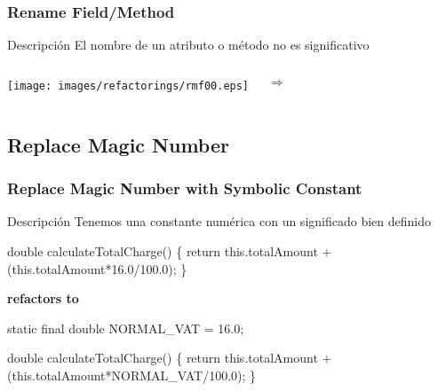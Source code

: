 ﻿\documentclass[animated,a4paper,slidestop,xcolor=pst,blue]{beamer}
\begin{document}
\begin{frame}
	\frametitle{Rename Field/Method}
	\begin{block}{Descripción}
	El nombre de un atributo o método no es significativo
	\end{block}
	\begin{columns}
		\begin{center}
			\texttt{[image: images/refactorings/rmf00.eps]}
		\end{center}
		\begin{center}
			\Huge $\Rightarrow$
		\end{center}
	\end{columns}
\end{frame}

\subsection{Replace Magic Number}

\begin{frame}[fragile]
	\frametitle{Replace Magic Number with Symbolic Constant}
	\begin{block}{Descripción}
	Tenemos una constante numérica con un significado bien definido
	\end{block}
	\begin{scriptsize}
	\begin{semiverbatim}
	double calculateTotalCharge() \{
	   return this.totalAmount +
			 (this.totalAmount*16.0/100.0);
	\}
	\end{semiverbatim}
	\end{scriptsize}
	\begin{center}
		\textbf{refactors to}
	\end{center}
	\begin{scriptsize}
	\begin{semiverbatim}
	static final double NORMAL_VAT = 16.0;

	double calculateTotalCharge() \{
	   return this.totalAmount +
			 (this.totalAmount*NORMAL_VAT/100.0);
	\}
	\end{semiverbatim}
	\end{scriptsize}
\end{frame}
\end{document}
